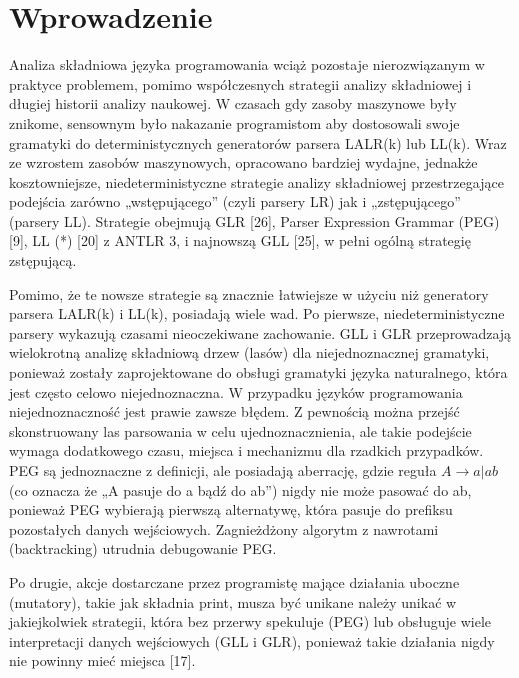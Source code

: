 ﻿\section{Wprowadzenie}
Analiza składniowa języka programowania wciąż pozostaje nierozwiązanym w praktyce problemem,
pomimo współczesnych strategii analizy składniowej i długiej historii analizy naukowej.
W czasach gdy zasoby maszynowe były znikome, sensownym było nakazanie programistom aby dostosowali
swoje gramatyki do deterministycznych generatorów parsera LALR(k) lub LL(k).\footnotemark[1]
Wraz ze wzrostem zasobów maszynowych, opracowano bardziej wydajne, jednakże kosztowniejsze,
niedeterministyczne strategie analizy składniowej przestrzegające podejścia zarówno „wstępującego”
(czyli parsery LR) jak i „zstępującego” (parsery LL).
Strategie obejmują GLR [26], Parser Expression Grammar (PEG) [9], LL (*) [20] z ANTLR 3,
i najnowszą GLL [25], w pełni ogólną strategię zstępującą.
\par
Pomimo, że te nowsze strategie są znacznie łatwiejsze w użyciu niż generatory parsera LALR(k) i LL(k),
posiadają wiele wad.
Po pierwsze, niedeterministyczne parsery wykazują czasami nieoczekiwane zachowanie.
GLL i GLR przeprowadzają wielokrotną analizę składniową drzew (lasów) dla niejednoznacznej gramatyki,
ponieważ zostały zaprojektowane do obsługi gramatyki języka naturalnego,
która jest często celowo niejednoznaczna.
W przypadku języków programowania niejednoznaczność jest prawie zawsze błędem.
Z pewnością można przejść skonstruowany las parsowania w celu ujednoznacznienia,
ale takie podejście wymaga dodatkowego czasu, miejsca i mechanizmu dla rzadkich przypadków. 
PEG są jednoznaczne z definicji, ale posiadają aberrację, gdzie reguła \(A \rightarrow a | ab\)
(co oznacza że „A pasuje do a bądź do ab”) nigdy nie może pasować do ab, ponieważ
PEG wybierają pierwszą alternatywę, która pasuje do prefiksu pozostałych danych wejściowych.
Zagnieżdżony algorytm z nawrotami (backtracking) utrudnia debugowanie PEG. 
\par
Po drugie, akcje dostarczane przez programistę mające działania uboczne (mutatory),
takie jak składnia print, musza być unikane należy unikać w jakiejkolwiek strategii,
która bez przerwy spekuluje (PEG) lub obsługuje wiele interpretacji danych wejściowych
(GLL i GLR), ponieważ takie działania nigdy nie powinny mieć miejsca [17].
